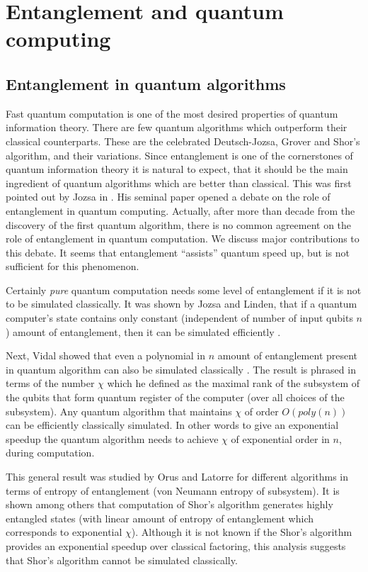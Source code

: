 \documentclass[twocolumn,aps,rmp]{revtex4}
\begin{document}
\section{Entanglement and quantum computing}


\subsection{Entanglement in quantum algorithms}

Fast quantum computation is one of the most desired properties of
quantum information theory. There are few quantum algorithms which
outperform their classical counterparts. These are the celebrated
Deutsch-Jozsa, Grover and Shor's algorithm, and their variations.
Since entanglement is one of the cornerstones of quantum information
theory it is natural to expect, that it should be the main
ingredient of quantum algorithms which are better than classical.
This was first pointed out by Jozsa in \cite{Jozsa_ent_qc_first}.
His seminal paper opened a debate on the role of entanglement in
quantum computing. Actually, after more than decade from the
discovery of the first quantum algorithm, there is no common
agreement on the role of entanglement in quantum computation. We
discuss major contributions to this debate. It seems that
entanglement ``assists'' quantum speed up, but is not sufficient for
this phenomenon.

Certainly {\it pure} quantum computation needs some level of
entanglement if it is not to be simulated classically. It was shown
by Jozsa and Linden, that if a quantum computer's state contains
only constant (independent of number of input qubits $n$) amount of
entanglement, then it can be simulated efficiently
\cite{JozsaLinden}.

Next, Vidal showed  that even a polynomial in $n$ amount of
entanglement present in quantum algorithm can also be simulated
classically \cite{Vidal}. The result is phrased in terms of the
number $\chi$ which he defined as the maximal rank of the subsystem
of the qubits that form quantum register of the computer (over all
choices of the subsystem). Any quantum algorithm that maintains
$\chi$ of order $O(poly(n))$ can be efficiently classically
simulated. In other words to give an exponential speedup the quantum
algorithm needs to achieve $\chi$ of exponential order in $n$,
during computation.

This general result was studied by Orus and Latorre
\cite{OrusLatorre} for different algorithms in terms of entropy of
entanglement (von Neumann entropy of subsystem). It is shown among
others that computation of Shor's algorithm generates highly
entangled states (with linear amount of entropy of entanglement
which corresponds to exponential $\chi$). Although it is not known
if the Shor's algorithm provides an exponential speedup over
classical factoring, this analysis suggests that Shor's algorithm
cannot be simulated classically.
\end{document}
